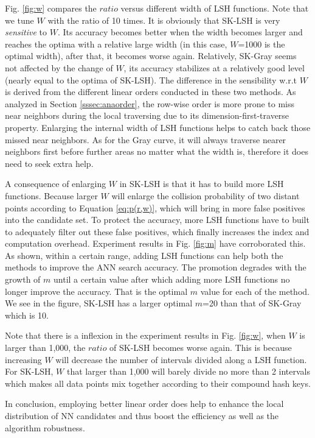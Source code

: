 \documentclass[twocolumn]{svjour3}          %
\begin{document}
Fig. \ref{fig:w} compares the $ratio$ versus different width of LSH functions. Note that we tune $W$ with the ratio of 10 times. It is obviously that SK-LSH is very \emph{sensitive} to $W$. Its accuracy becomes better when the width becomes larger and reaches the optima with a relative large width (in this case, $W$=1000 is the optimal width), after that, it becomes worse again. Relatively, SK-Gray seems not affected by the change of $W$, its accuracy stabilizes at a relatively good level (nearly equal to the optima of SK-LSH). The difference in the sensibility w.r.t $W$ is derived from the different linear orders conducted in these two methods. As analyzed in Section \ref{sssec:anaorder}, the row-wise order is more prone to miss near neighbors during the local traversing due to its dimension-first-traverse property. Enlarging the internal width of LSH functions helps to catch back those missed near neighbors. As for the Gray curve, it will always traverse nearer neighbors first before further areas no matter what the width is, therefore it does need to seek extra help.


A consequence of enlarging $W$ in SK-LSH is that it has to build more LSH functions. Because larger $W$ will enlarge the collision probability of two distant points according to Equation \ref{eq:p(r,w)}, which will bring in more false positives into the candidate set. To protect the accuracy, more LSH functions have to built to adequately filter out these false positives, which finally increases the index and computation overhead. Experiment results in Fig. \ref{fig:m} have corroborated this. As shown, within a certain range, adding LSH functions can help both the methods to improve the ANN search accuracy. The promotion degrades with the growth of $m$ until a certain value after which adding more LSH functions no longer improve the accuracy. That is the optimal $m$ value for each of the method. We see in the figure, SK-LSH has a larger optimal $m$=20 than that of SK-Gray which is 10. 


Note that there is a inflexion in the experiment results in Fig. \ref{fig:w}, when $W$ is larger than 1,000, the $ratio$ of SK-LSH becomes worse again. This is because increasing $W$ will decrease the number of intervals divided along a LSH function. For SK-LSH, $W$ that larger than 1,000 will barely divide no more than 2 intervals which makes all data points mix together according to their compound hash keys.

In conclusion, employing better linear order does help to enhance the local distribution of NN candidates and thus boost the efficiency as well as the algorithm robustness.
\end{document}
